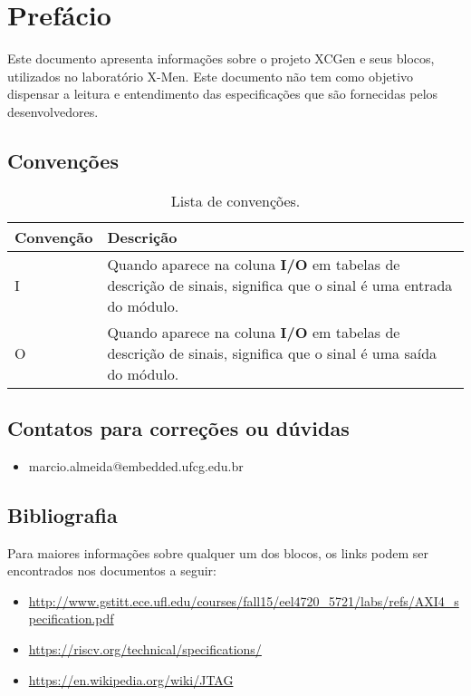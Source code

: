 \section{Prefácio} %
\label{sec:prefácio}
 Este documento apresenta informações sobre o projeto XCGen e seus blocos, utilizados no laboratório X-Men.
 Este documento não tem como objetivo dispensar a leitura e entendimento das especificações que são fornecidas pelos desenvolvedores.

\subsection{Convenções}

\begin{table}[H]
  \centering
  \renewcommand\arraystretch{1.25}
  \caption{Lista de convenções.}
  \vspace{0.3cm}
  \begin{tabular}{|P{2.5cm}|P{10.5cm}|}
    \hline
    \textbf{Convenção} & \textbf{Descrição} \\ \hline
    I                  & Quando aparece na coluna \textbf{I/O} em tabelas de descrição de sinais, significa que o sinal é uma entrada do módulo. \\ \hline
    O                  & Quando aparece na coluna \textbf{I/O} em tabelas de descrição de sinais, significa que o sinal é uma saída do módulo. \\ \hline
  \end{tabular}
\end{table}
\subsection{Contatos para correções ou dúvidas}
\begin{itemize}
\item marcio.almeida@embedded.ufcg.edu.br
\end{itemize}
\subsection{Bibliografia} %

Para maiores informações sobre qualquer um dos blocos, os links podem ser encontrados nos documentos a seguir:
\begin{itemize}
\item \url{http://www.gstitt.ece.ufl.edu/courses/fall15/eel4720_5721/labs/refs/AXI4_specification.pdf}
\item \url{https://riscv.org/technical/specifications/}
\item \url{https://en.wikipedia.org/wiki/JTAG}
\end{itemize}
\label{sub:bibliografia}


